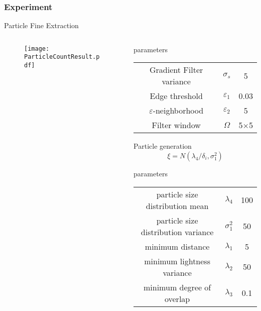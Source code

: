 \documentclass[14pt,hyperref={CJKbookmarks=true}]{beamer}
\theoremstyle{plain}
\theoremstyle{definition}
\theoremstyle{remark}
\begin{document}
\begin{frame}
\frametitle{Experiment}{Particle Fine Extraction}
\begin{columns}[onlytextwidth]
\begin{column}{0.5\textwidth}
\begin{figure}
\texttt{[image: ParticleCountResult.pdf]}
\end{figure}
\end{column}
\begin{column}{0.5\textwidth}
\scriptsize
\begin{block}{parameters}

\begin{tabular}{c|c|c}
\hline
Gradient Filter variance& $\sigma_s$ & 5 \\
Edge threshold& $\varepsilon_1$ & 0.03 \\
$\varepsilon$-neighborhood& $\varepsilon_2$&  5\\
Filter window& $\Omega$&5$\times$5\\\hline
\end{tabular}
\end{block}
\begin{block}{Particle generation}
\begin{equation}
\xi=N(\lambda_4/\delta_i,\sigma_1^2)
\end{equation}
\end{block}
\begin{block}{parameters}
\begin{tabular}{c|c|c}
\hline
 particle size distribution mean& $\lambda_4$ & 100\\
 particle size distribution variance&$\sigma^2_1$ &  50\\
 minimum distance  & $\lambda_1$&  5\\
 minimum lightness variance& $\lambda_2$&50\\
 minimum degree of overlap &$\lambda_3$&0.1\\\hline
\end{tabular}
\end{block}
\end{column}
\end{columns}

\end{frame}
\end{document}
